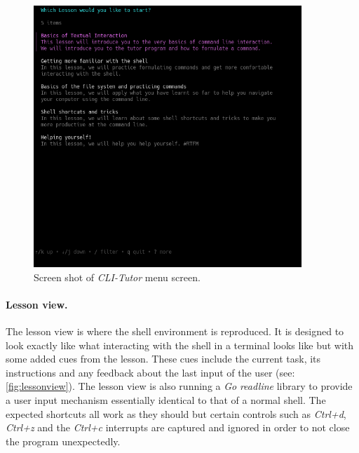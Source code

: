 \begin{figure}[htbp]
	\centering
	\includegraphics[width=0.9\textwidth]{img/menushort}
	\caption{Screen shot of \textit{CLI-Tutor} menu screen.}
	\label{fig:clitutormenu}
\end{figure}


\paragraph{Lesson view.} The lesson view is where the shell environment is
reproduced. It is designed to look exactly like what interacting with the shell
in a terminal looks like but with some added cues from the lesson. These cues
include the current task, its instructions and any feedback about the last
input of the user (see: \autoref{fig:lessonview}). The lesson view is also
running a \textit{Go} \textit{readline} library to provide a user input
mechanism essentially identical to that of a normal shell. The expected
shortcuts all work as they should but certain controls such as \textit{Ctrl+d},
\textit{Ctrl+z} and the \textit{Ctrl+c} interrupts are captured and ignored in
order to not close the program unexpectedly.

